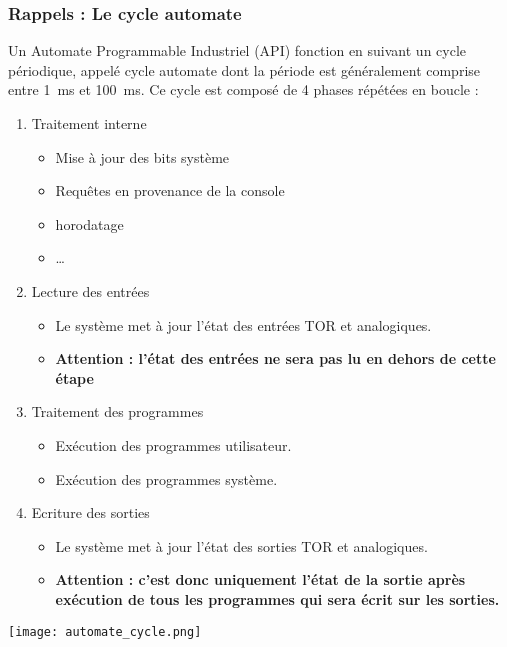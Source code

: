 \subsubsection{Rappels : Le cycle automate}
Un Automate Programmable Industriel (API) fonction en suivant un cycle périodique, appelé cycle automate dont la période est généralement comprise entre \SI{1}{\milli\second} et \SI{100}{\milli\second}. 
Ce cycle est composé de 4 phases répétées en boucle :

\begin{minipage}[c]{.65\linewidth}
\begin{enumerate}
    \item Traitement interne 
    \begin{itemize}
        \item Mise à jour des bits système 
        \item Requêtes en provenance de la console
        \item horodatage
        \item \dots
    \end{itemize}
    \item Lecture des entrées
    \begin{itemize}
        \item Le système met à jour l'état des entrées TOR et analogiques.
        \item \textbf{Attention : l'état des entrées ne sera pas lu en dehors de cette étape}
    \end{itemize}
    \item Traitement des programmes
    \begin{itemize}
        \item Exécution des programmes utilisateur.
        \item Exécution des programmes système.
    \end{itemize}
    \item Ecriture des sorties 
    \begin{itemize}
        \item Le système met à jour l'état des sorties TOR et analogiques.
        \item \textbf{Attention : c'est donc uniquement l'état de la sortie après exécution de tous les programmes qui sera écrit sur les sorties.}
    \end{itemize}

\end{enumerate}
\end{minipage}%
\begin{minipage}[c]{.3\linewidth}
    \begin{center}
        \texttt{[image: automate\_cycle.png]}
    \end{center}
\end{minipage}


